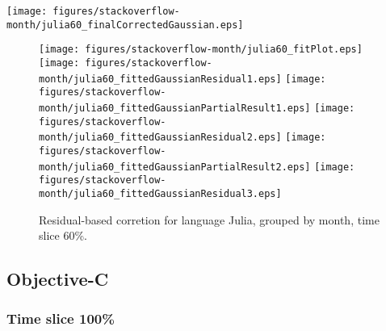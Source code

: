 \begin{center}
{\texttt{[image: figures/stackoverflow-month/julia60\_finalCorrectedGaussian.eps]}}
\end{center}

\FloatBarrier

\begin{figure}[t]
\centering
{}
{\texttt{[image: figures/stackoverflow-month/julia60\_fitPlot.eps]}}
{\texttt{[image: figures/stackoverflow-month/julia60\_fittedGaussianResidual1.eps]}}
{\texttt{[image: figures/stackoverflow-month/julia60\_fittedGaussianPartialResult1.eps]}}
{\texttt{[image: figures/stackoverflow-month/julia60\_fittedGaussianResidual2.eps]}}
{\texttt{[image: figures/stackoverflow-month/julia60\_fittedGaussianPartialResult2.eps]}}
{\texttt{[image: figures/stackoverflow-month/julia60\_fittedGaussianResidual3.eps]}}
\caption{Residual-based corretion for language Julia, grouped by month, time slice 60\%.}
\end{figure}


\FloatBarrier


\subsection{Objective-C}

\subsubsection{Time slice 100\%}

